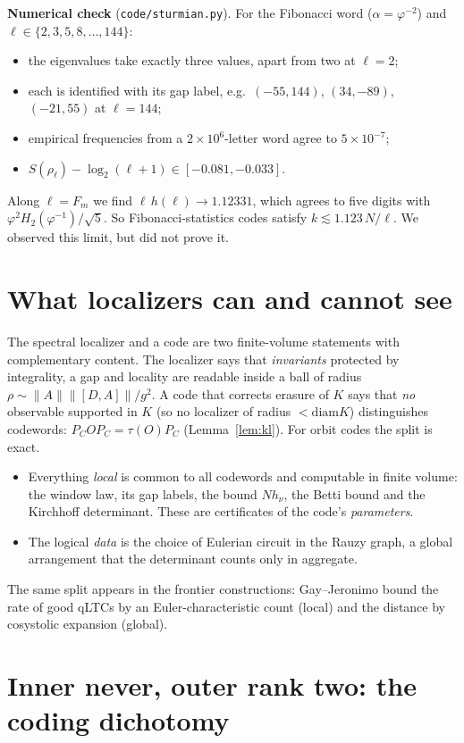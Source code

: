 \documentclass[11pt]{article}
\theoremstyle{definition}
\theoremstyle{remark}
\begin{document}
\textbf{Numerical check} (\texttt{code/sturmian.py}). For the Fibonacci word ($\alpha=\varphi^{-2}$) and $\ell\in\{2,3,5,8,\dots,144\}$:
\begin{itemize}
\item the eigenvalues take exactly three values, apart from two at $\ell=2$;
\item each is identified with its gap label, e.g.\ $(-55,144)$, $(34,-89)$, $(-21,55)$ at $\ell=144$;
\item empirical frequencies from a $2\times10^6$-letter word agree to $5\times10^{-7}$;
\item $S(\rho_\ell)-\log_2(\ell+1)\in[-0.081,-0.033]$.
\end{itemize}
Along $\ell=F_m$ we find $\ell\,h(\ell)\to1.12331$, which agrees to five digits with $\varphi^2H_2(\varphi^{-1})/\sqrt5$. So Fibonacci-statistics codes satisfy $k\lesssim1.123\,N/\ell$. We observed this limit, but did not prove it.

\section{What localizers can and cannot see}\label{sec:loc}

The spectral localizer and a code are two finite-volume statements with complementary content. The localizer says that \emph{invariants} protected by integrality, a gap and locality are readable inside a ball of radius $\rho\sim\|A\|\|[D,A]\|/g^2$. A code that corrects erasure of $K$ says that \emph{no} observable supported in $K$ (so no localizer of radius $<\mathrm{diam}K$) distinguishes codewords: $P_COP_C=\tau(O)P_C$ (Lemma~\ref{lem:kl}). For orbit codes the split is exact.
\begin{itemize}
\item Everything \emph{local} is common to all codewords and computable in finite volume: the window law, its gap labels, the bound $Nh_\nu$, the Betti bound and the Kirchhoff determinant. These are certificates of the code's \emph{parameters}.
\item The logical \emph{data} is the choice of Eulerian circuit in the Rauzy graph, a global arrangement that the determinant counts only in aggregate.
\end{itemize}
The same split appears in the frontier constructions: Gay--Jeronimo bound the rate of good qLTCs by an Euler-characteristic count (local) and the distance by cosystolic expansion (global).

\section{Inner never, outer rank two: the coding dichotomy}
\end{document}
